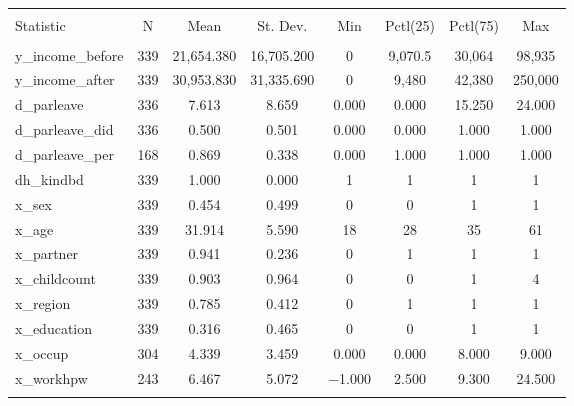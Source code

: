 
\begin{table}[!htbp] \centering 
  \caption{} 
  \label{} 
\begin{tabular}{@{\extracolsep{5pt}}lccccccc} 
\\[-1.8ex]\hline 
\hline \\[-1.8ex] 
Statistic & \multicolumn{1}{c}{N} & \multicolumn{1}{c}{Mean} & \multicolumn{1}{c}{St. Dev.} & \multicolumn{1}{c}{Min} & \multicolumn{1}{c}{Pctl(25)} & \multicolumn{1}{c}{Pctl(75)} & \multicolumn{1}{c}{Max} \\ 
\hline \\[-1.8ex] 
y\_income\_before & 339 & 21,654.380 & 16,705.200 & 0 & 9,070.5 & 30,064 & 98,935 \\ 
y\_income\_after & 339 & 30,953.830 & 31,335.690 & 0 & 9,480 & 42,380 & 250,000 \\ 
d\_parleave & 336 & 7.613 & 8.659 & 0.000 & 0.000 & 15.250 & 24.000 \\ 
d\_parleave\_did & 336 & 0.500 & 0.501 & 0.000 & 0.000 & 1.000 & 1.000 \\ 
d\_parleave\_per & 168 & 0.869 & 0.338 & 0.000 & 1.000 & 1.000 & 1.000 \\ 
dh\_kindbd & 339 & 1.000 & 0.000 & 1 & 1 & 1 & 1 \\ 
x\_sex & 339 & 0.454 & 0.499 & 0 & 0 & 1 & 1 \\ 
x\_age & 339 & 31.914 & 5.590 & 18 & 28 & 35 & 61 \\ 
x\_partner & 339 & 0.941 & 0.236 & 0 & 1 & 1 & 1 \\ 
x\_childcount & 339 & 0.903 & 0.964 & 0 & 0 & 1 & 4 \\ 
x\_region & 339 & 0.785 & 0.412 & 0 & 1 & 1 & 1 \\ 
x\_education & 339 & 0.316 & 0.465 & 0 & 0 & 1 & 1 \\ 
x\_occup & 304 & 4.339 & 3.459 & 0.000 & 0.000 & 8.000 & 9.000 \\ 
x\_workhpw & 243 & 6.467 & 5.072 & $-$1.000 & 2.500 & 9.300 & 24.500 \\ 
\hline \\[-1.8ex] 
\end{tabular} 
\end{table} 
